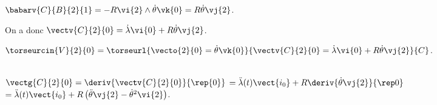 $\babarv{C}{B}{2}{1}=-R\vi{2}\wedge \dot{\theta}\vk{0}=R\dot{\theta}\vj{2}$.

On a donc $\vectv{C}{2}{0}=\dot{\lambda}\vi{0}+R\dot{\theta}\vj{2}$.

\else
\fi

\ifprof

$\torseurcin{V}{2}{0}=\torseurl{\vecto{2}{0}=\dot{\theta}\vk{0}}{\vectv{C}{2}{0}=\dot{\lambda}\vi{0}+R\dot{\theta}\vj{2}}{C}$.


\else
\fi

\ifprof ~\\

$\vectg{C}{2}{0} =\deriv{\vectv{C}{2}{0}}{\rep{0}}$
$= \ddot{\lambda}(t) \vect{i_0} + R \deriv{\dot{\theta} \vj{2}}{\rep0}$
$= \ddot{\lambda}(t) \vect{i_0} + R \left(\ddot{\theta} \vj{2} - \dot{\theta}^2 \vi{2}\right) $.
\else
\fi

